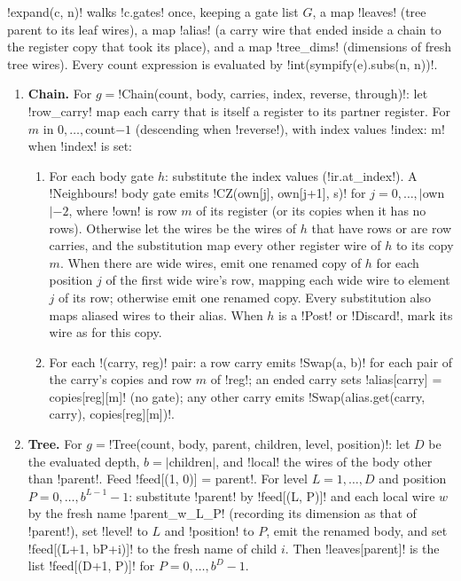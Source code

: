 \begin{algorithm}[Expansion]\label{alg:bench-tools-expand}
\py!expand(c, n)! walks \py!c.gates! once, keeping a gate list $G$, a map \py!leaves! (tree parent to its leaf wires), a map \py!alias! (a carry wire that ended inside a chain to the register copy that took its place), and a map \py!tree_dims! (dimensions of fresh tree wires). Every count expression is evaluated by \py!int(sympify(e).subs(n, n))!.
\begin{enumerate}
\item \textbf{Chain.} For $g=$\py!Chain(count, body, carries, index, reverse, through)!: let \py!row_carry! map each carry that is itself a register to its partner register. For $m$ in $0,\ldots,$count$-1$ (descending when \py!reverse!), with index values \py!{index: m}! when \py!index! is set:
  \begin{enumerate}
  \item For each body gate $h$: substitute the index values (\py!ir.at_index!). A \py!Neighbours! body gate emits \py!CZ(own[j], own[j+1], s)! for $j=0,\ldots,|$own$|-2$, where \py!own! is row $m$ of its register (or its copies when it has no rows). Otherwise let the  wires be the wires of $h$ that have rows or are row carries, and the  substitution map every other register wire of $h$ to its copy $m$. When there are wide wires, emit one renamed copy of $h$ for each position $j$ of the first wide wire's row, mapping each wide wire to element $j$ of its row; otherwise emit one renamed copy. Every substitution also maps aliased wires to their alias. When $h$ is a \py!Post! or \py!Discard!, mark its wire as  for this copy.
  \item For each \py!(carry, reg)! pair: a row carry emits \py!Swap(a, b)! for each pair of the carry's copies and row $m$ of \py!reg!; an ended carry sets \py!alias[carry] = copies[reg][m]! (no gate); any other carry emits \py!Swap(alias.get(carry, carry), copies[reg][m])!.
  \end{enumerate}
\item \textbf{Tree.} For $g=$\py!Tree(count, body, parent, children, level, position)!: let $D$ be the evaluated depth, $b=|$children$|$, and \py!local! the wires of the body other than \py!parent!. Feed \py!feed[(1, 0)] = parent!. For level $L=1,\ldots,D$ and position $P=0,\ldots,b^{L-1}-1$: substitute \py!parent! by \py!feed[(L, P)]! and each local wire $w$ by the fresh name \code!parent_w_L_P! (recording its dimension as that of \py!parent!), set \py!level! to $L$ and \py!position! to $P$, emit the renamed body, and set \py!feed[(L+1, bP+i)]! to the fresh name of child $i$. Then \py!leaves[parent]! is the list \py!feed[(D+1, P)]! for $P=0,\ldots,b^D-1$.

\end{enumerate}
\end{algorithm}
